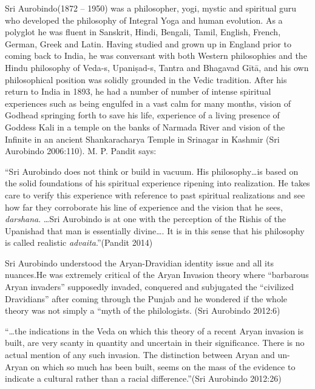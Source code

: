 Sri Aurobindo(1872 – 1950) was a philosopher, yogi, mystic and spiritual guru who developed the philosophy of Integral Yoga and human evolution. As a polyglot he was fluent in Sanskrit, Hindi, Bengali, Tamil, English, French, German, Greek and Latin. Having studied and grown up in England prior to coming back to India, he was conversant with both Western philosophies and the Hindu philosophy of Veda-s, Upaniṣad-s, Tantra and Bhagavad Gītā, and his own philosophical position was solidly grounded in the Vedic tradition. After his return to India in 1893, he had a number of number of intense spiritual experiences such as being engulfed in a vast calm for many months, vision of Godhead springing forth to save his life, experience of a living presence of Goddess Kali in a temple on the banks of Narmada River and vision of the Infinite in an ancient Shankaracharya Temple in Srinagar in Kashmir (Sri Aurobindo 2006:110). M. P. Pandit says:

\newpage

\begin{myquote}
“Sri Aurobindo does not think or build in vacuum. His philosophy…is based on the solid foundations of his spiritual experience ripening into realization. He takes care to verify this experience with reference to past spiritual realizations and see how far they corroborate his line of experience and the vision that he sees, \textit{darshana}. …Sri Aurobindo is at one with the perception of the Rishis of the Upanishad that man is essentially divine…. It is in this sense that his philosophy is called realistic \textit{advaita}.”(Pandit 2014)
\end{myquote}

Sri Aurobindo understood the Aryan-Dravidian identity issue and all its nuances.He was extremely critical of the Aryan Invasion theory where “barbarous Aryan invaders” supposedly invaded, conquered and subjugated the “civilized Dravidians” after coming through the Punjab and he wondered if the whole theory was not simply a “myth of the philologists. (Sri Aurobindo 2012:6)

\begin{myquote}
“…the indications in the Veda on which this theory of a recent Aryan invasion is built, are very scanty in quantity and uncertain in their significance. There is no actual mention of any such invasion. The distinction between Aryan and un-Aryan on which so much has been built, seems on the mass of the evidence to indicate a cultural rather than a racial difference.”(Sri Aurobindo 2012:26)
\end{myquote}

